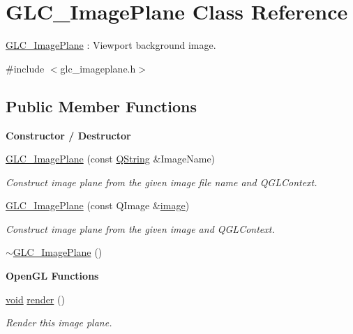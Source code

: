 \hypertarget{class_g_l_c___image_plane}{\section{G\-L\-C\-\_\-\-Image\-Plane Class Reference}
\label{class_g_l_c___image_plane}
}


\hyperlink{class_g_l_c___image_plane}{G\-L\-C\-\_\-\-Image\-Plane} \-: Viewport background image.  




{\ttfamily \#include $<$glc\-\_\-imageplane.\-h$>$}

\subsection*{Public Member Functions}
\begin{Indent}{\bf Constructor / Destructor}\par
\begin{DoxyCompactItemize}
\item 
\hyperlink{class_g_l_c___image_plane_acbee3bde6727fc67d7f771e2c0d35d0d}{G\-L\-C\-\_\-\-Image\-Plane} (const \hyperlink{group___u_a_v_objects_plugin_gab9d252f49c333c94a72f97ce3105a32d}{Q\-String} \&Image\-Name)
\begin{DoxyCompactList}\small\item\em Construct image plane from the given image file name and Q\-G\-L\-Context. \end{DoxyCompactList}\item 
\hyperlink{class_g_l_c___image_plane_a5e14610bbde336bcc47e63d4e2e830e0}{G\-L\-C\-\_\-\-Image\-Plane} (const Q\-Image \&\hyperlink{glext_8h_a4f252db605f5b9117603096756e79824}{image})
\begin{DoxyCompactList}\small\item\em Construct image plane from the given image and Q\-G\-L\-Context. \end{DoxyCompactList}\item 
\hyperlink{class_g_l_c___image_plane_abdd7fb5cbc12054795bd1a3765f4b5d6}{$\sim$\-G\-L\-C\-\_\-\-Image\-Plane} ()
\end{DoxyCompactItemize}
\end{Indent}
\begin{Indent}{\bf Open\-G\-L Functions}\par
\begin{DoxyCompactItemize}
\item 
\hyperlink{group___u_a_v_objects_plugin_ga444cf2ff3f0ecbe028adce838d373f5c}{void} \hyperlink{class_g_l_c___image_plane_acd4b642937c5c415e413801e5db0fcb4}{render} ()
\begin{DoxyCompactList}\small\item\em Render this image plane. \end{DoxyCompactList}\end{DoxyCompactItemize}
\end{Indent}


